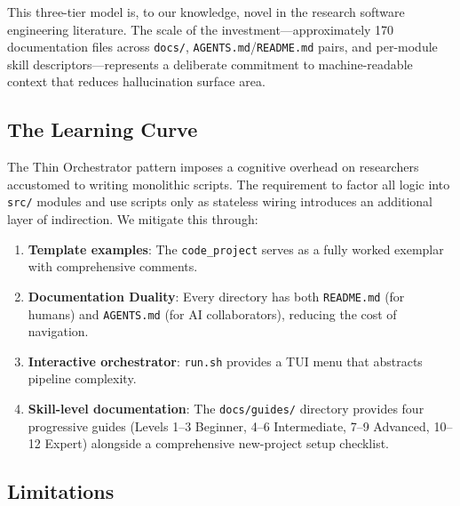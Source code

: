 \documentclass[
]{article}
\providecommand{\tightlist}{%
  \setlength{\itemsep}{0pt}\setlength{\parskip}{0pt}}
\begin{document}
This three-tier model is, to our knowledge, novel in the research
software engineering literature. The scale of the
investment---approximately 170 documentation files across
\texttt{docs/}, \texttt{AGENTS.md}/\texttt{README.md} pairs, and
per-module skill descriptors---represents a deliberate commitment to
machine-readable context that reduces hallucination surface area.

\subsection{The Learning Curve}\label{the-learning-curve}

The Thin Orchestrator pattern imposes a cognitive overhead on
researchers accustomed to writing monolithic scripts. The requirement to
factor all logic into \texttt{src/} modules and use scripts only as
stateless wiring introduces an additional layer of indirection. We
mitigate this through:

\begin{enumerate}
\def\labelenumi{\arabic{enumi}.}
\tightlist
\item
  \textbf{Template examples}: The \texttt{code\_project} serves as a
  fully worked exemplar with comprehensive comments.
\item
  \textbf{Documentation Duality}: Every directory has both
  \texttt{README.md} (for humans) and \texttt{AGENTS.md} (for AI
  collaborators), reducing the cost of navigation.
\item
  \textbf{Interactive orchestrator}: \texttt{run.sh} provides a TUI menu
  that abstracts pipeline complexity.
\item
  \textbf{Skill-level documentation}: The \texttt{docs/guides/}
  directory provides four progressive guides (Levels 1--3 Beginner, 4--6
  Intermediate, 7--9 Advanced, 10--12 Expert) alongside a comprehensive
  new-project setup checklist.
\end{enumerate}

\subsection{Limitations}\label{limitations}
\end{document}
